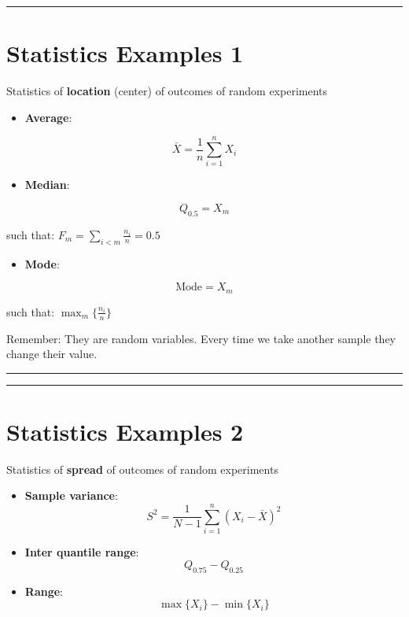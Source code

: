 \documentclass[
]{book}
\providecommand{\tightlist}{%
  \setlength{\itemsep}{0pt}\setlength{\parskip}{0pt}}
\begin{document}
\begin{center}\rule{0.5\linewidth}{0.5pt}\end{center}

\hypertarget{statistics-examples-1}{%
\section{Statistics Examples 1}\label{statistics-examples-1}}

Statistics of \textbf{location} (center) of outcomes of random experiments

\begin{itemize}
\tightlist
\item
  \textbf{Average}:
\end{itemize}

\[\bar{X}=\frac{1}{n}\sum_{i=1}^n X_i\]

\begin{itemize}
\tightlist
\item
  \textbf{Median}:
\end{itemize}

\[Q_{0.5}=X_m\]

such that: \(F_m=\sum_{i<m} \frac{n_i}{n}=0.5\)

\begin{itemize}
\tightlist
\item
  \textbf{Mode}:
\end{itemize}

\[\text{Mode}= X_{m}\]

such that: \(\max_m\{\frac{n_i}{n}\}\)

Remember: They are random variables. Every time we take another sample they change their value.

\begin{center}\rule{0.5\linewidth}{0.5pt}\end{center}

\begin{center}\rule{0.5\linewidth}{0.5pt}\end{center}

\hypertarget{statistics-examples-2}{%
\section{Statistics Examples 2}\label{statistics-examples-2}}

Statistics of \textbf{spread} of outcomes of random experiments

\begin{itemize}
\item
  \textbf{Sample variance}:
  \[S^2=\frac{1}{N-1}\sum_{i=1}^n (X_i-\bar{X})^2\]
\item
  \textbf{Inter quantile range}:
  \[Q_{0.75}-Q_{0.25}\]
\item
  \textbf{Range}:
  \[\max\{X_i\}-\min\{X_i\}\]
\end{itemize}
\end{document}
